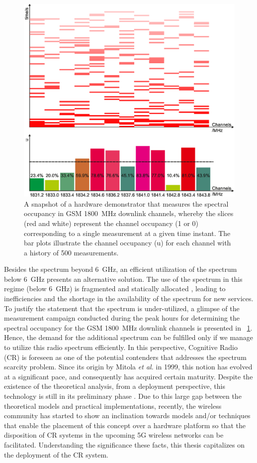 \begin{figure}[!t]
\centering
\includegraphics[width = 0.9\columnwidth]{figures/Grafik_Poster}
\caption{A snapshot of a hardware demonstrator that measures the spectral occupancy in GSM \SI{1800}{MHz} downlink channels, whereby the slices (red and white) represent the channel occupancy (1 or 0) corresponding to a single measurement at a given time instant. The bar plots illustrate the channel occupancy (u) for each channel with a history of 500 measurements\protect{}.}
\label{fig:HW_I}
\end{figure}


Besides the spectrum beyond \SI{6}{GHz}, an efficient utilization of the spectrum below \SI{6}{GHz} presents an alternative solution. The use of the spectrum in this regime (below \SI{6}{GHz}) is fragmented and statically allocated \cite{Mchen05, Mchen07}, leading to inefficiencies and the shortage in the availability of the spectrum for new services. To justify the statement that the spectrum is under-utilized, a glimpse of the measurement campaign conducted during the peak hours for determining the spectral occupancy for the GSM \SI{1800}{MHz} downlink channels is presented in \figurename~\ref{fig:HW_I}. Hence, the demand for the additional spectrum can be fulfilled only if we manage to utilize this radio spectrum efficiently. In this perspective, Cognitive Radio (CR) is foreseen as one of the potential contenders that addresses the spectrum scarcity problem. Since its origin by Mitola \textit{et al.} in 1999, this notion has evolved at a significant pace, and consequently has acquired certain maturity. Despite the existence of the theoretical analysis, from a deployment perspective, this technology is still in its preliminary phase \cite{Pawe11}. Due to this large gap between the theoretical models and practical implementations, recently, the wireless community has started to show an inclination towards models and/or techniques that enable the placement of this concept over a hardware platform so that the disposition of CR systems in the upcoming 5G wireless networks can be facilitated. Understanding the significance these facts, this thesis capitalizes on the deployment of the CR system. 


